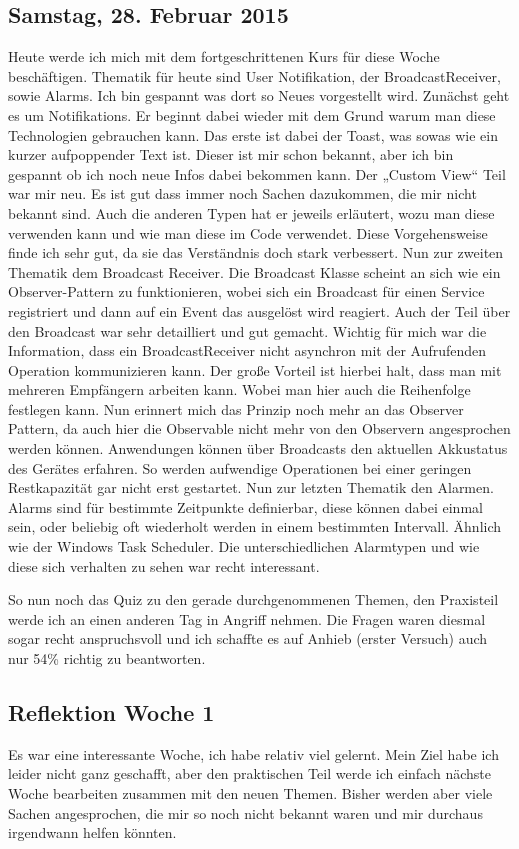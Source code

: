 \documentclass[12pt,a4paper,bibliography=totocnumbered,listof=totocnumbered]{scrartcl}
\begin{document}
\subsection{Samstag, 28. Februar 2015}
Heute werde ich mich mit dem fortgeschrittenen Kurs für diese Woche beschäftigen. Thematik für heute sind User Notifikation, der BroadcastReceiver, sowie Alarms. Ich bin gespannt was dort so Neues vorgestellt wird. 
Zunächst geht es um Notifikations. 
Er beginnt dabei wieder mit dem Grund warum man diese Technologien gebrauchen kann. Das erste ist dabei der Toast, was sowas wie ein kurzer aufpoppender Text ist. Dieser ist mir schon bekannt, aber ich bin gespannt ob ich noch neue Infos dabei bekommen kann. Der „Custom View“ Teil war mir neu. Es ist gut dass immer noch Sachen dazukommen, die mir nicht bekannt sind. 
Auch die anderen Typen hat er jeweils erläutert, wozu man diese verwenden kann und wie man diese im Code verwendet. Diese Vorgehensweise finde ich sehr gut, da sie das Verständnis doch stark verbessert.
Nun zur zweiten Thematik dem Broadcast Receiver. 
Die Broadcast Klasse scheint an sich wie ein Observer-Pattern zu funktionieren, wobei sich ein Broadcast für einen Service registriert und dann auf ein Event das ausgelöst wird reagiert. 
Auch der Teil über den Broadcast war sehr detailliert und gut gemacht. Wichtig für mich war die Information, dass ein BroadcastReceiver nicht asynchron mit der Aufrufenden Operation kommunizieren kann. Der große Vorteil ist hierbei halt, dass man mit mehreren Empfängern arbeiten kann. Wobei man hier auch die Reihenfolge festlegen kann. Nun erinnert mich das Prinzip noch mehr an das Observer Pattern, da auch hier die Observable nicht mehr von den Observern angesprochen werden können. Anwendungen können über Broadcasts den aktuellen Akkustatus des Gerätes erfahren. So werden aufwendige Operationen bei einer geringen Restkapazität gar nicht erst gestartet. 
Nun zur letzten Thematik den Alarmen.
Alarms sind für bestimmte Zeitpunkte definierbar, diese können dabei einmal sein, oder beliebig oft wiederholt werden in einem bestimmten Intervall. Ähnlich wie der Windows Task Scheduler. Die unterschiedlichen Alarmtypen und wie diese sich verhalten zu sehen war recht interessant. 

So nun noch das Quiz zu den gerade durchgenommenen Themen, den Praxisteil werde ich an einen anderen Tag in Angriff nehmen. 
Die Fragen waren diesmal sogar recht anspruchsvoll und ich schaffte es auf Anhieb (erster Versuch) auch nur 54\% richtig zu beantworten. 

\subsection{Reflektion Woche 1 }
Es war eine interessante Woche, ich habe relativ viel gelernt. Mein Ziel habe ich leider nicht ganz geschafft, aber den praktischen Teil werde ich einfach nächste Woche bearbeiten zusammen mit den neuen Themen. Bisher werden aber viele Sachen angesprochen, die mir so noch nicht bekannt waren und mir durchaus irgendwann helfen könnten. 
\end{document}
